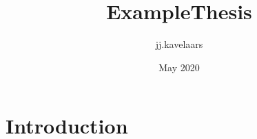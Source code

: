 \documentclass{article}
\title{ExampleThesis}
\author{jj.kavelaars }
\date{May 2020}
\begin{document}
\maketitle

\section{Introduction}
\end{document}
